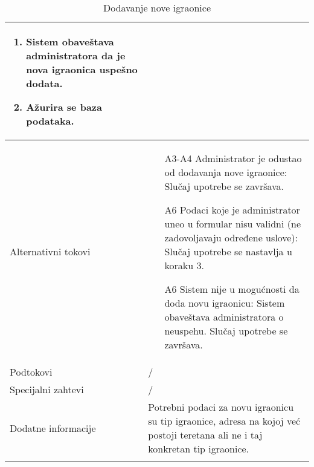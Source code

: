 \documentclass[../main.tex]{subfiles}
\begin{document}
\begin{longtable}{| p{} | p{} |}
\begin{enumerate}
        \item Sistem obaveštava administratora da je nova igraonica uspešno dodata.
        \item Ažurira se baza podataka.
    \end{enumerate}\\
\hline
    Alternativni tokovi & \begin{itemize}
        \item[A3-A4] Administrator je odustao od dodavanja nove igraonice: Slučaj upotrebe se završava.
        \item[A6] Podaci koje je administrator uneo u formular nisu validni (ne zadovoljavaju određene uslove): Slučaj upotrebe se nastavlja u koraku 3.
        \item[A6] Sistem nije u mogućnosti da doda novu igraonicu: Sistem obaveštava administratora o neuspehu. Slučaj upotrebe se završava.
    \end{itemize}\\
\hline
    Podtokovi & /\\
\hline
    Specijalni zahtevi & /\\
\hline
    Dodatne informacije & Potrebni podaci za novu igraonicu su tip igraonice, adresa na kojoj već postoji teretana ali ne i taj konkretan tip igraonice.
    \\
\hline
\caption{Dodavanje nove igraonice} %
\end{longtable}
\end{document}

